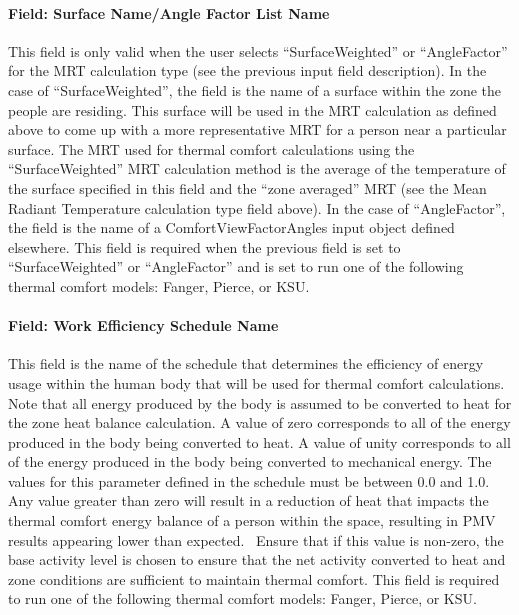 \paragraph{Field: Surface Name/Angle Factor List Name}\label{field-surface-nameangle-factor-list-name}

This field is only valid when the user selects ``SurfaceWeighted'' or ``AngleFactor'' for the MRT calculation type (see the previous input field description). In the case of ``SurfaceWeighted'', the field is the name of a surface within the zone the people are residing. This surface will be used in the MRT calculation as defined above to come up with a more representative MRT for a person near a particular surface. The MRT used for thermal comfort calculations using the ``SurfaceWeighted'' MRT calculation method is the average of the temperature of the surface specified in this field and the ``zone averaged'' MRT (see the Mean Radiant Temperature calculation type field above). In the case of ``AngleFactor'', the field is the name of a ComfortViewFactorAngles input object defined elsewhere. This field is required when the previous field is set to ``SurfaceWeighted'' or ``AngleFactor'' and is set to run one of the following thermal comfort models: Fanger, Pierce, or KSU.

\paragraph{Field: Work Efficiency Schedule Name}\label{field-work-efficiency-schedule-name}

This field is the name of the schedule that determines the efficiency of energy usage within the human body that will be used for thermal comfort calculations. Note that all energy produced by the body is assumed to be converted to heat for the zone heat balance calculation. A value of zero corresponds to all of the energy produced in the body being converted to heat. A value of unity corresponds to all of the energy produced in the body being converted to mechanical energy. The values for this parameter defined in the schedule must be between 0.0 and 1.0. Any value greater than zero will result in a reduction of heat that impacts the thermal comfort energy balance of a person within the space, resulting in PMV results appearing lower than expected.~ Ensure that if this value is non-zero, the base activity level is chosen to ensure that the net activity converted to heat and zone conditions are sufficient to maintain thermal comfort. This field is required to run one of the following thermal comfort models: Fanger, Pierce, or KSU. 

